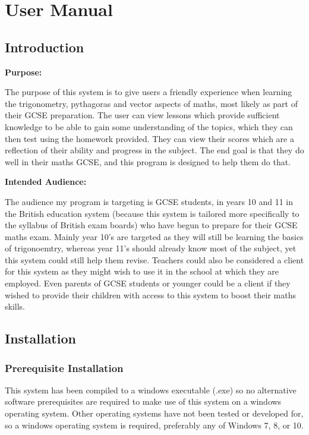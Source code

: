 \chapter{User Manual}

\section{Introduction}

\textbf{Purpose: }

The purpose of this system is to give users a friendly experience when learning the trigonometry, pythagoras and vector aspects of maths, most likely as part of their GCSE preparation. The user can view lessons which provide sufficient knowledge to be able to gain some understanding of the topics, which they can then test using the homework provided. They can view their scores which are a reflection of their ability and progress in the subject. The end goal is that they do well in their maths GCSE, and this program is designed to help them do that.

\textbf{Intended Audience: }

The audience my program is targeting is GCSE students, in years 10 and 11 in the British education system (because this system is tailored more specifically to the syllabus of British exam boards) who have begun to prepare for their GCSE maths exam. Mainly year 10's are targeted as they will still be learning the basics of trigonoemtry, whereas year 11's should already know most of the subject, yet this system could still help them revise. Teachers could also be considered a client for this system as they might wish to use it in the school at which they are employed. Even parents of GCSE students or younger could be a client if they wished to provide their children with access to this system to boost their maths skills.

\section{Installation}

\subsection{Prerequisite Installation}

This system has been compiled to a windows executable (.exe) so no alternative software prerequisites are required to make use of this system on a windows operating system. Other operating systems have not been tested or developed for, so a windows operating system is required, preferably any of Windows 7, 8, or 10.

